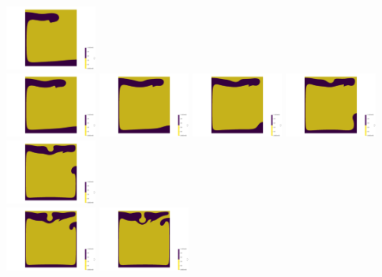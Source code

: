 \begin{itemize}
\begin{center}
\includegraphics[width=3cm]{images/benchmark_vaks97/aspect/lvl8/composition_threshold0004}\\
\includegraphics[width=3cm]{images/benchmark_vaks97/aspect/lvl8/composition_threshold0005}
\includegraphics[width=3cm]{images/benchmark_vaks97/aspect/lvl8/composition_threshold0006}
\includegraphics[width=3cm]{images/benchmark_vaks97/aspect/lvl8/composition_threshold0007}
\includegraphics[width=3cm]{images/benchmark_vaks97/aspect/lvl8/composition_threshold0008}
\includegraphics[width=3cm]{images/benchmark_vaks97/aspect/lvl8/composition_threshold0009}\\
\includegraphics[width=3cm]{images/benchmark_vaks97/aspect/lvl8/composition_threshold0010}
\includegraphics[width=3cm]{images/benchmark_vaks97/aspect/lvl8/composition_threshold0011}

\end{center}
\end{itemize}
